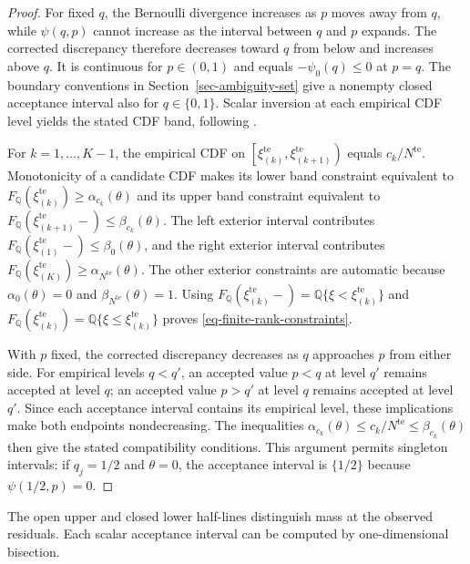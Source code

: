\documentclass[review,11pt,3p,authoryear,nopreprintline]{elsarticle}
\begin{document}
\begin{proof}
  For fixed $q$, the Bernoulli divergence increases as $p$ moves away from $q$, while $\psi(q,p)$ cannot increase as the interval between $q$ and $p$ expands. The corrected discrepancy therefore decreases toward $q$ from below and increases above $q$. It is continuous for $p\in(0,1)$ and equals $-\psi_0(q)\le0$ at $p=q$. The boundary conventions in Section~\ref{sec-ambiguity-set} give a nonempty closed acceptance interval also for $q\in\{0,1\}$. Scalar inversion at each empirical CDF level yields the stated CDF band, following \citet[Supplement, Section~S.6]{L.J23}.

  For $k=1,\ldots,K-1$, the empirical CDF on $\left[\xi_{(k)}^{\mathrm{te}},\xi_{(k+1)}^{\mathrm{te}}\right)$ equals $c_k/N^{\mathrm{te}}$. Monotonicity of a candidate CDF makes its lower band constraint equivalent to $F_{\mathbb Q}\left(\xi_{(k)}^{\mathrm{te}}\right)\ge\alpha_{c_k}(\theta)$ and its upper band constraint equivalent to $F_{\mathbb Q}\left(\xi_{(k+1)}^{\mathrm{te}}-\right)\le\beta_{c_k}(\theta)$. The left exterior interval contributes $F_{\mathbb Q}\left(\xi_{(1)}^{\mathrm{te}}-\right)\le\beta_0(\theta)$, and the right exterior interval contributes $F_{\mathbb Q}\left(\xi_{(K)}^{\mathrm{te}}\right)\ge\alpha_{N^{\mathrm{te}}}(\theta)$. The other exterior constraints are automatic because $\alpha_0(\theta)=0$ and $\beta_{N^{\mathrm{te}}}(\theta)=1$. Using $F_{\mathbb Q}\left(\xi_{(k)}^{\mathrm{te}}-\right)=\mathbb Q\{\xi<\xi_{(k)}^{\mathrm{te}}\}$ and $F_{\mathbb Q}\left(\xi_{(k)}^{\mathrm{te}}\right)=\mathbb Q\{\xi\le \xi_{(k)}^{\mathrm{te}}\}$ proves \eqref{eq-finite-rank-constraints}.

  With $p$ fixed, the corrected discrepancy decreases as $q$ approaches $p$ from either side. For empirical levels $q<q'$, an accepted value $p<q$ at level $q'$ remains accepted at level $q$; an accepted value $p>q'$ at level $q$ remains accepted at level $q'$. Since each acceptance interval contains its empirical level, these implications make both endpoints nondecreasing. The inequalities $\alpha_{c_k}(\theta)\le c_k/N^{\mathrm{te}}\le\beta_{c_k}(\theta)$ then give the stated compatibility conditions. This argument permits singleton intervals: if $q_j=1/2$ and $\theta=0$, the acceptance interval is $\{1/2\}$ because $\psi(1/2,p)=0$.
\end{proof}

The open upper and closed lower half-lines distinguish mass at the observed residuals. Each scalar acceptance interval can be computed by one-dimensional bisection.
\end{document}
